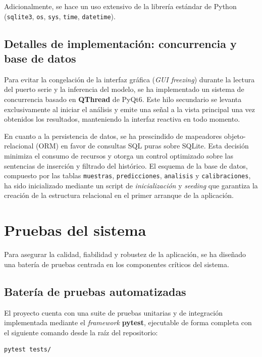 Adicionalmente, se hace un uso extensivo de la librería estándar de Python
(\texttt{sqlite3}, \texttt{os}, \texttt{sys}, \texttt{time}, \texttt{datetime}).
\subsection*{Detalles de implementación: concurrencia y base de datos}

Para evitar la congelación de la interfaz gráfica (\textit{GUI freezing})
durante la lectura del puerto serie y la inferencia del modelo, se ha
implementado un sistema de concurrencia basado en \textbf{QThread} de PyQt6.
Este hilo secundario se levanta exclusivamente al iniciar el análisis y emite
una señal a la vista principal una vez obtenidos los resultados, manteniendo
la interfaz reactiva en todo momento.

En cuanto a la persistencia de datos, se ha prescindido de mapeadores
objeto-relacional (ORM) en favor de consultas SQL puras sobre SQLite. Esta
decisión minimiza el consumo de recursos y otorga un control optimizado sobre
las sentencias de inserción y filtrado del histórico. El esquema de la base de
datos, compuesto por las tablas \texttt{muestras}, \texttt{predicciones},
\texttt{analisis} y \texttt{calibraciones}, ha sido inicializado mediante un
script de \textit{inicialización} y  \textit{seeding} que garantiza la creación de la estructura relacional
en el primer arranque de la aplicación.
\newpage
\section{Pruebas del sistema}

Para asegurar la calidad, fiabilidad y robustez de la aplicación, se ha diseñado
una batería de pruebas centrada en los componentes críticos del sistema.

\subsection*{Batería de pruebas automatizadas}

El proyecto cuenta con una suite de pruebas unitarias y de integración
implementada mediante el \textit{framework} \textbf{pytest\cite{pytest2024docs}}, ejecutable
de forma completa con el siguiente comando desde la raíz del repositorio:

\begin{verbatim}
pytest tests/
\end{verbatim}


